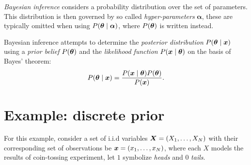 

\emph{Bayesian inference} considers a probability distribution over the set of parameters. This distribution is then governed by so called \emph{hyper-parameters} \(\bm{\alpha}\), these are typically omitted when using \(P(\bm{\theta} \mid \bm{\alpha})\), where \(P(\bm{\theta})\) is written instead.

Bayesian inference attempts to determine the \emph{posterior distribution} \(P(\bm{\theta} \mid \bm{x})\) using a \emph{prior belief} \(P(\bm{\theta})\) and the \emph{likelihood function} \(P(\bm{x} \mid \bm{\theta})\) on the basis of Bayes' theorem:
\[
  P(\bm{\theta} \mid  \bm{x}) = \frac{P(\bm{x}  \mid  \bm{\theta})P(\bm{\theta})}{P(\bm{x})}.
\]


\section{Example: discrete prior}

For this example, consider a set of i.i.d variables \(\bm{X} = (X_{1},\dots, X_{N})\) with their corresponding set of observations be \(\bm{x} = (x_{1},\dots,x_{N})\), where each \(X\) models the results of coin-tossing experiment, let \(1\) symbolize \emph{heads} and \(0\) \emph{tails}.

